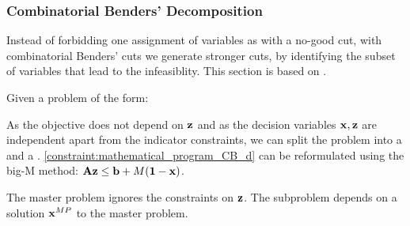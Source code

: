 \subsubsection{Combinatorial Benders' Decomposition} \label{section:optimization_CB}
Instead of forbidding one assignment of variables as with a no-good cut, with combinatorial Benders' cuts we generate stronger cuts, by identifying the subset of variables that lead to the infeasiblity. This section is based on \cite{codato_combinatorial_2006}.

Given a problem of the form:
As the objective does not depend on $\bold z$ and as the decision variables $\bold x, \bold z$ are independent apart from the indicator constraints, we can split the problem into a  and a . \cref{constraint:mathematical_program_CB_d} can be reformulated using the big-M method: $\bold A \bold z \leq \bold b + M(\bold 1- \bold x)$.

The master problem ignores the constraints on $\bold z$. The subproblem depends on a solution $\bold x^{MP}$ to the master problem. 

